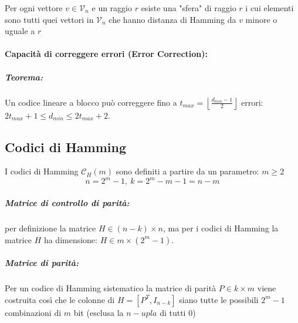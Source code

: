                 Per ogni vettore $v\in\mathcal{V}_n$ e un raggio $r$ esiste una "sfera" di raggio $r$ i cui elementi sono tutti quei vettori in $\mathcal{V}_n$ che hanno
                distanza di Hamming da $v$ minore o uguale a $r$

            \paragraph{Capacità di correggere errori (Error Correction):}
                \subparagraph{Teorema:}\begin{sloppypar}
                Un codice lineare a blocco può correggere fino a ${t_{max} = \left\lfloor \frac{d_{min}-1}{2} \right\rfloor}$ errori: $2t_{max}+1 \leq d_{min} \leq 2t_{max}+2$.
                \end{sloppypar}
    \subsection{Codici di Hamming}
        I codici di Hamming $\mathcal{C}_H(m)$ sono definiti a partire da un parametro: $m \geq 2$
        \[
            n = 2^m-1,\ k = 2^m-m-1 = n-m
        \]
        \subparagraph{Matrice di controllo di parità:} per definizione la matrice $H \in (n-k)\times n$, ma per i codici di Hamming la matrice $H$ ha dimensione:
        $H \in m\times (2^m-1)$.

        \subparagraph{Matrice di parità:} Per un codice di Hamming sistematico la matrice di parità $P\in k \times m$ viene costruita così che le colonne di $H = [P^T,I_{n-k}]$
        siano tutte le possibili $2^m-1$ combinazioni di $m$ bit (esclusa la $n-upla$ di tutti 0)
